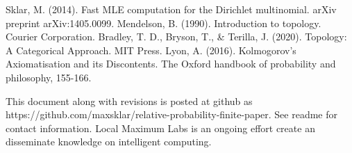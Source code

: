 \documentclass[twoside]{article}
\begin{document}
\begin{thebibliography}{20}

Sklar, M. (2014). Fast MLE computation for the Dirichlet multinomial. arXiv preprint arXiv:1405.0099.
Mendelson, B. (1990). Introduction to topology. Courier Corporation.
Bradley, T. D., Bryson, T., \& Terilla, J. (2020). Topology: A Categorical Approach. MIT Press.
Lyon, A. (2016). Kolmogorov’s Axiomatisation and its Discontents. The Oxford handbook of probability and philosophy, 155-166.

\end{thebibliography}

This document along with revisions is posted at github as https://github.com/maxsklar/relative-probability-finite-paper. See readme for contact information. Local Maximum Labs is an ongoing effort create an disseminate knowledge on intelligent computing.
\end{document}
